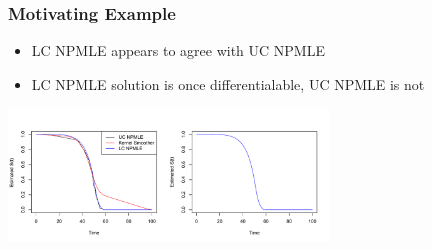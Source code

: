 \documentclass[compress,red]{beamer}
\begin{document}
\begin{frame}

\frametitle{Motivating Example}

	\begin{itemize}
	
	\item LC NPMLE appears to agree with UC NPMLE
	
	\item LC NPMLE solution is once differentialable, UC NPMLE is not 
	
	\end{itemize}

\centerline{ \includegraphics[width = 8.5cm]{Allplot.pdf} }

\end{frame}
\end{document}
